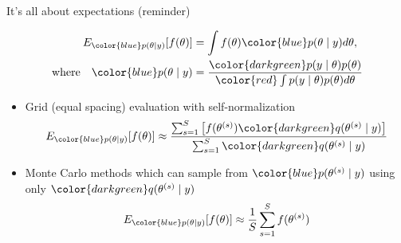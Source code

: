 \documentclass[finnish,english,t]{beamer}
\begin{document}
\begin{frame}{It's all about expectations (reminder)}

  \vspace{-1.5\baselineskip}
   \begin{align*}
     E_{\color{blue} p(\theta \mid y)}[f(\theta)] & = \int f(\theta) {\color{blue} p(\theta \mid y)} d\theta,\\
     \text{where} \quad
     {\color{blue} p(\theta \mid y)} & = \frac{\color{darkgreen}p(y \mid \theta)p(\theta)}{\color{red} \int p(y \mid \theta)p(\theta) d\theta}
   \end{align*}

 \begin{itemize}
   \vspace{-0.5\baselineskip}
    \item<4-> Grid (equal spacing) evaluation with self-normalization
      \begin{align*}
        E_{\color{blue} p(\theta \mid y)}[f(\theta)] \approx
        \frac{\sum_{s=1}^S \left[f(\theta^{(s)}){\color{darkgreen}q(\theta^{(s)} \mid y)}\right]}{\sum_{s=1}^S{\color{darkgreen}q(\theta^{(s)} \mid y)}}
      \end{align*}
    \item<5-> Monte Carlo methods which can sample from
      ${\color{blue}p(\theta^{(s)} \mid y)}$ using only
      ${\color{darkgreen}q(\theta^{(s)} \mid y)}$
         \vspace{-0.5\baselineskip}
      \begin{align*}
        E_{\color{blue} p(\theta \mid y)}[f(\theta)] \approx \frac{1}{S} \sum_{s=1}^S f(\theta^{(s)})
      \end{align*}
    \end{itemize}
   
\end{frame}
\end{document}
